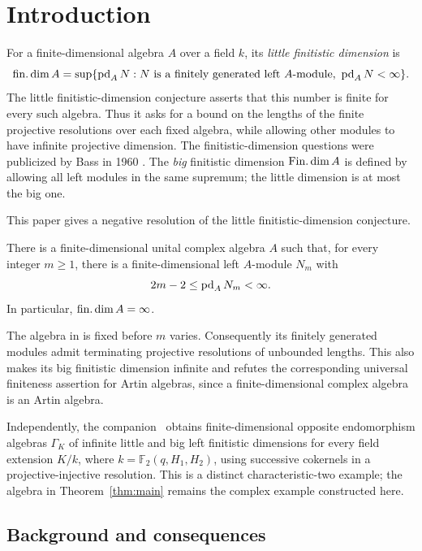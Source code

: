 \section{Introduction}
\label{sec:introduction}

For a finite-dimensional algebra \(A\) over a field \(k\), its
\emph{little finitistic dimension} is
\[
\operatorname{fin.dim} A
=\sup\{\operatorname{pd}_A N:
       N\text{ is a finitely generated left }A\text{-module},
       \ \operatorname{pd}_A N<\infty\}.
\]
The little finitistic-dimension conjecture asserts that this number
is finite for every such algebra.  Thus it asks for a bound on the
lengths of the finite projective resolutions over each fixed algebra,
while allowing other modules to have infinite projective dimension.
The finitistic-dimension questions were publicized by Bass in
1960 \cite{Bass1960}.  The \emph{big} finitistic dimension \(\operatorname{Fin.dim} A\)
is defined by allowing all left modules in the same supremum; the little
dimension is at most the big one.

This paper gives a negative resolution of the little
finitistic-dimension conjecture.

\begin{theorem}\label{thm:main}
There is a finite-dimensional unital complex algebra \(A\) such that,
for every integer \(m\ge1\), there is a finite-dimensional left
\(A\)-module \(N_m\) with
\[
2m-2\le\operatorname{pd}_A N_m<\infty.
\]
In particular, \(\operatorname{fin.dim} A=\infty\).
\end{theorem}

The algebra in  is fixed before \(m\) varies.
Consequently its finitely generated modules admit terminating
projective resolutions of unbounded lengths.  This also makes its
big finitistic dimension infinite and refutes the corresponding
universal finiteness assertion for Artin algebras, since a
finite-dimensional complex algebra is an Artin algebra.

Independently, the companion~\cite[Corollary~1.3]{OpenAITachikawa2026}
obtains finite-dimensional opposite endomorphism algebras \(\Gamma_K\)
of infinite little and big left finitistic dimensions for every field
extension \(K/k\), where \(k=\mathbb F_2(q,H_1,H_2)\), using successive
cokernels in a projective-injective resolution. This is a distinct
characteristic-two example; the algebra in Theorem~\ref{thm:main}
remains the complex example constructed here.

\subsection{Background and consequences}

